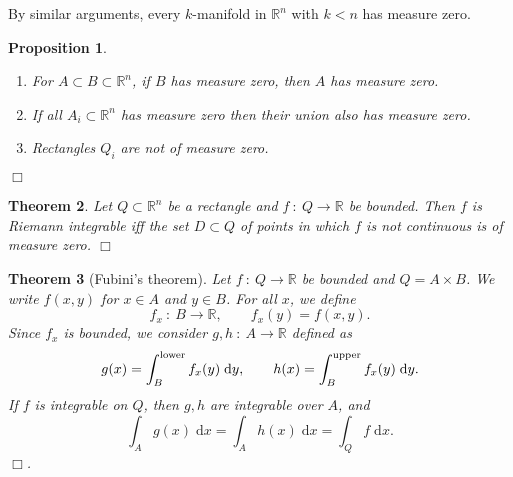 \documentclass[letter-paper]{tufte-book}
\newtheorem{theorem}{\color{pastel-blue}Theorem}[section]
\newtheorem{proposition}[theorem]{\color{pastel-blue}Proposition}
\newcommand{\qedwhite}{\hfill \ensuremath{\Box}}
\begin{document}
By similar arguments, every $k$-manifold in $\mathbb{R}^n$ with $k<n$ has measure zero.

\begin{proposition}
  \begin{enumerate}
    \item For $A \subset B \subset \mathbb{R}^n$, if $B$ has measure zero, then $A$ has measure zero.
    \item If all $A_i \subset \mathbb{R}^n$ has measure zero then their union also has measure zero.
    \item Rectangles $Q_i$ are not of measure zero.
  \end{enumerate}
  \qedwhite
\end{proposition}

\begin{theorem}
  Let $Q\subset \mathbb{R}^n$ be a rectangle and $f\ :\ Q \to \mathbb{R}$ be bounded. Then $f$ is Riemann integrable iff the set $D \subset Q$ of points in which $f$ is not continuous is of measure zero. \qedwhite
\end{theorem}

\begin{theorem}[Fubini's theorem]
  Let $f\ :\ Q \to \mathbb{R}$ be bounded and $Q = A \times B$. We write $f(x,y)$ for $x\in A$ and $y\in B$. For all $x$, we define
  \begin{equation*}
    f_x\ :\ B \to \mathbb{R}, \qquad f_x(y) = f(x,y).
  \end{equation*}
  Since $f_x$ is bounded, we consider $g, h\ :\ A\to\mathbb{R}$ defined as
  \begin{equation*}
    g(x) = \int_B^{\textnormal{lower}} f_x(y)\; \mathrm{d}y, \qquad h(x) = \int_B^{\textnormal{upper}} f_x(y)\; \mathrm{d}y.
  \end{equation*}
  If $f$ is integrable on $Q$, then $g, h$ are integrable over $A$, and
  \begin{equation}
    \int_A g(x)\; \mathrm{d}x = \int_A h(x)\; \mathrm{d}x = \int_Q f\; \mathrm{d}x.
  \end{equation}
  \qedwhite.
\end{theorem}
\end{document}

